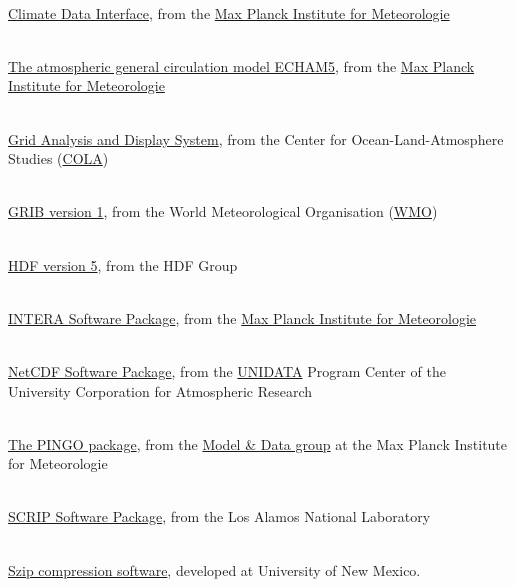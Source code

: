 \begin{thebibliography}{xx}

\label{CDI}
 \ \\
  \href{http://www.mpimet.mpg.de/cdi}
       {Climate Data Interface},
  from the
  \href{http://www.mpimet.mpg.de}
       {Max Planck Institute for Meteorologie}

\label{ECHAM}
 \ \\
  \href{http://www.mpimet.mpg.de/wissenschaft/publikationen/reports.html}
       {The atmospheric general circulation model ECHAM5},
  from the
  \href{http://www.mpimet.mpg.de}
       {Max Planck Institute for Meteorologie}

\label{GrADS}
 \ \\
  \href{http://www.iges.org/grads/}
       {Grid Analysis and Display System},
  from the Center for Ocean-Land-Atmosphere Studies
  (\href{http://www.iges.org/cola.html}{COLA})

\label{GRIB}
 \ \\
  \href{http://www.wmo.ch/web/www/WMOCodes/Guides/GRIB/GRIB1-Contents.html}
       {GRIB version 1},
  from the World Meteorological Organisation
  (\href{http://www.wmo.ch}{WMO})

\label{HDF5}
 \ \\
  \href{http://hdf.ncsa.uiuc.edu/HDF5/}
       {HDF version 5},
  from the HDF Group

\label{INTERA}
 \ \\
  \href{http://wekuw.met.fu-berlin.de/~IngoKirchner/nudging/nudging}{INTERA Software Package},
  from the
  \href{http://www.mpimet.mpg.de}
       {Max Planck Institute for Meteorologie}

\label{netCDF}
 \ \\
  \href{http://www.unidata.ucar.edu/packages/netcdf}{NetCDF Software Package},
  from the
  \href{http://www.unidata.ucar.edu}{UNIDATA}
  Program Center of the University Corporation for Atmospheric Research

\label{PINGO}
 \ \\
  \href{http://www.mad.zmaw.de/Pingo/post/down/BigPingo.pdf}{The PINGO package},
  from the
  \href{http://www.mad.zmaw.de}{Model \& Data group}
  at the Max Planck Institute for Meteorologie

\label{SCRIP}
 \ \\
  \href{http://climate.lanl.gov/Software/SCRIP}{SCRIP Software Package},
  from the Los Alamos National Laboratory

\label{szip}
 \ \\
  \href{http://hdf.ncsa.uiuc.edu/doc_resource/SZIP}{Szip compression software},
  developed at University of New Mexico.

\end{thebibliography}
